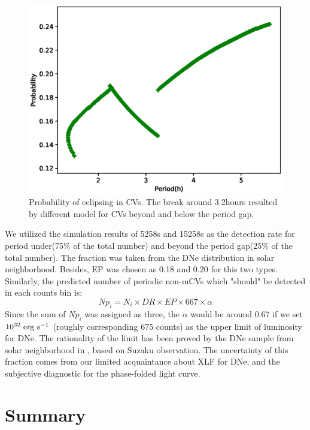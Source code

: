 \documentclass[twoside,twocolumn]{aastex63}
\begin{document}
\begin{figure}[ht!]
\centering
\includegraphics[scale=0.55]{./figure/p_inCV.eps}
\caption{Probability of eclipsing in CVs. The break around 3.2hours resulted by different model for CVs beyond and below the period gap.\label{fig:simpCV}}
\end{figure}
We utilized the simulation results of 5258s and 15258s as the detection rate for period under(75\% of the total number) and beyond the period gap(25\% of the total number). The fraction was taken from the DNe distribution in solar neighborhood. Besides, EP was chosen as 0.18 and 0.20 for this two types.
Similarly, the predicted number of periodic non-mCVs which "should" be detected in each counts bin is:
\begin{equation}
Np_{i}=N_i\times DR \times EP \times 667 \times \alpha	
\end{equation}
Since the sum of $Np_{i}$ was assigned as three, the $\alpha$ would be around 0.67 if we set $\rm 10^{32}~erg~s^{-1}$ (roughly corresponding 675 counts) as the upper limit of luminosity for DNe. The rationality of the limit has been proved by the DNe sample from solar neighborhood in \citep{2016ApJ...818..136X}, based on Suzaku observation. The uncertainty of this fraction comes from our limited acquaintance about XLF for DNe, and the subjective diagnostic for the phase-folded light curve. 


\section{Summary}\label{sec:summary}
\end{document}

